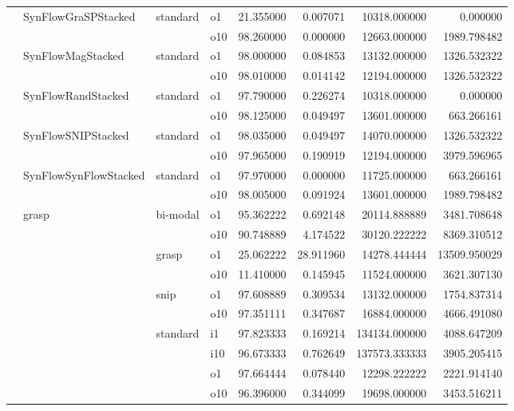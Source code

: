 \begin{longtable}{llllrrrr}
      & SynFlowGraSPStacked & standard & o1 &  21.355000 &   0.007071 &     10318.000000 &      0.000000 \\
      &     &         & o10 &  98.260000 &   0.000000 &     12663.000000 &   1989.798482 \\
      & SynFlowMagStacked & standard & o1 &  98.000000 &   0.084853 &     13132.000000 &   1326.532322 \\
      &     &         & o10 &  98.010000 &   0.014142 &     12194.000000 &   1326.532322 \\
      & SynFlowRandStacked & standard & o1 &  97.790000 &   0.226274 &     10318.000000 &      0.000000 \\
      &     &         & o10 &  98.125000 &   0.049497 &     13601.000000 &    663.266161 \\
      & SynFlowSNIPStacked & standard & o1 &  98.035000 &   0.049497 &     14070.000000 &   1326.532322 \\
      &     &         & o10 &  97.965000 &   0.190919 &     12194.000000 &   3979.596965 \\
      & SynFlowSynFlowStacked & standard & o1 &  97.970000 &   0.000000 &     11725.000000 &    663.266161 \\
      &     &         & o10 &  98.005000 &   0.091924 &     13601.000000 &   1989.798482 \\
      & grasp & bi-modal & o1 &  95.362222 &   0.692148 &     20114.888889 &   3481.708648 \\
      &     &         & o10 &  90.748889 &   4.174522 &     30120.222222 &   8369.310512 \\
      &     & grasp & o1 &  25.062222 &  28.911960 &     14278.444444 &  13509.950029 \\
      &     &         & o10 &  11.410000 &   0.145945 &     11524.000000 &   3621.307130 \\
      &     & snip & o1 &  97.608889 &   0.309534 &     13132.000000 &   1754.837314 \\
      &     &         & o10 &  97.351111 &   0.347687 &     16884.000000 &   4666.491080 \\
      &     & standard & i1 &  97.823333 &   0.169214 &    134134.000000 &   4088.647209 \\
      &     &         & i10 &  96.673333 &   0.762649 &    137573.333333 &   3905.205415 \\
      &     &         & o1 &  97.664444 &   0.078440 &     12298.222222 &   2221.914140 \\
      &     &         & o10 &  96.396000 &   0.344099 &     19698.000000 &   3453.516211 \\

\end{longtable}
